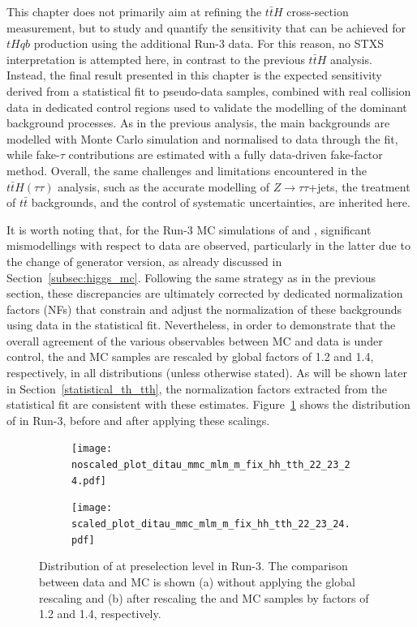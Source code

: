 This chapter does not primarily aim at refining the $t\bar{t}H$ cross-section measurement, but to study and quantify the sensitivity that can be achieved for $tHqb$ production using the additional Run-3 data. 
For this reason, no STXS interpretation is attempted here, in contrast to the previous $t\bar{t}H$ analysis. 
Instead, the final result presented in this chapter is the expected sensitivity derived from a statistical fit to pseudo-data samples, combined with real collision data in dedicated control regions used to validate the modelling of the dominant background processes. 
As in the previous analysis, the main backgrounds are modelled with Monte Carlo simulation and normalised to data through the fit, while fake-$\tau$ contributions are estimated with a fully data-driven fake-factor method. 
Overall, the same challenges and limitations encountered in the $t\bar{t}H(\tau\tau)$ analysis, such as the accurate modelling of $Z\to\tau\tau$+jets, the treatment of $t\bar{t}$ backgrounds, and the control of systematic uncertainties, are inherited here.

It is worth noting that, for the Run-3 MC simulations of \ttbar and \ztautau, significant mismodellings with respect to data are observed, particularly in the latter due to the change of generator version, as already discussed in Section~\ref{subsec:higgs_mc}. 
Following the same strategy as in the previous section, these discrepancies are ultimately corrected by dedicated normalization factors (NFs) that constrain and adjust the normalization of these backgrounds using data in the statistical fit. 
Nevertheless, in order to demonstrate that the overall agreement of the various observables between MC and data is under control, the \ttbar and \ztautau MC samples are rescaled by global factors of 1.2 and 1.4, respectively, in all distributions (unless otherwise stated). 
As will be shown later in Section~\ref{statistical_th_tth}, the normalization factors extracted from the statistical fit are consistent with these estimates. 
Figure~\ref{mmc_scaled} shows the distribution of \mmc in Run-3, before and after applying these scalings.

\begin{figure}[htbp]
    \centering
    \begin{subfigure}[b]{0.49\textwidth}
      \centering
      \texttt{[image: noscaled\_plot\_ditau\_mmc\_mlm\_m\_fix\_hh\_tth\_22\_23\_24.pdf]}
      \caption{}
    \end{subfigure}
    \hfill
    \begin{subfigure}[b]{0.49\textwidth}
      \centering
      \texttt{[image: scaled\_plot\_ditau\_mmc\_mlm\_m\_fix\_hh\_tth\_22\_23\_24.pdf]}
      \caption{}
    \end{subfigure}
    \caption{
      Distribution of \mmc at preselection level in Run-3. 
      The comparison between data and MC is shown (a) without applying the global rescaling and (b) after rescaling the \ttbar and \ztautau MC samples by factors of 1.2 and 1.4, respectively.
    }
    \label{mmc_scaled}
  \end{figure}
  
